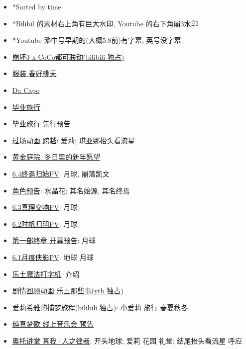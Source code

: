 \documentclass[a4paper]{article}
\begin{document}
\begin{itemize}
    \item *Sorted by time
    \item *Bilibil 的素材右上角有巨大水印, Youtube 的右下角崩3水印.
    \item *Youtube 繁中号早期的(大概5.8前)有字幕, 英号没字幕.
    \item \href{https://www.bilibili.com/video/BV1j84y1D7uf/}{崩坏3 x CoCo都可联动(bilibili 独占)}
    \item \href{https://www.bilibili.com/video/BV1tP411f7BY/}{服装 春好桃夭}
    \item \href{https://www.bilibili.com/video/BV1aM4y1R77W/}{Da Capo}
    \item \href{https://www.bilibili.com/video/BV1Kj411g7Lu/}{毕业旅行}
    \item \href{https://www.bilibili.com/video/BV1BD4y1g7Yp/}{毕业旅行 先行预告}
    \item \href{https://www.bilibili.com/video/BV1784y1p7vM/}{过场动画 跨越}: 爱莉; 琪亚娜抬头看流星
    \item \href{https://www.bilibili.com/video/BV1oA411o7zD/}{黄金庭院: 冬日里的新年愿望}
    \item \href{https://www.bilibili.com/video/BV12g411H7sC/}{6.4终焉归始PV}: 月球, 崩落凯文
    \item \href{https://www.bilibili.com/video/BV1jW4y1K7mE/}{角色预告}: 水晶花; 其名始源, 其名终焉
    \item \href{https://www.bilibili.com/video/BV12g411H7sC/}{6.3真理交响PV}: 月球
    \item \href{https://www.bilibili.com/video/BV1vY411f7qz/}{6.2时帆归羽PV}: 月球
    \item \href{https://www.bilibili.com/video/BV1eV4y1K7c7/}{第一部终章 开幕预告}: 月球
    \item \href{https://www.bilibili.com/video/BV1dd4y1B7Xb/}{6.1月痕侠影PV}: 地球 月球
    \item \href{https://www.bilibili.com/video/BV1f24y1d7tP/}{乐土魔法打字机}: 介绍
    \item \href{https://www.youtube.com/watch?v=p_aPQhXCVCM}{剧情回顾动画 乐土那些事(ytb 独占)}
    \item \href{https://www.bilibili.com/video/BV1ZW4y1t7Zf/}{爱莉希雅的捕梦旅程(bilibili 独占)}: 小爱莉 旅行 春夏秋冬
    \item \href{https://www.bilibili.com/bangumi/play/ep672059/}{纯真梦歌 线上音乐会 预告}
    \item \href{https://www.bilibili.com/video/BV1q14y147EC/}{奥托讲堂 真我·人之律者}: 开头地球; 爱莉 花园 礼堂; 结尾抬头看流星 呼应

\end{itemize}
\end{document}
